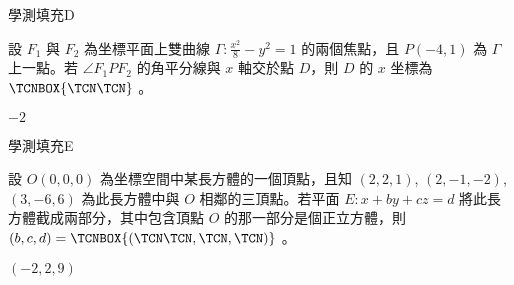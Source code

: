     \begin{QUESTION}
        \begin{ExamInfo}{97}{學測}{填充}{D}
        \end{ExamInfo}
        \begin{ExamAnsRateInfo}{35}{72}{27}{6}
        \end{ExamAnsRateInfo}
        \begin{QBODY}
            設 $F_1$ 與 $F_2$ 為坐標平面上雙曲線 $\Gamma : \frac{x^2}{8} - y^2 =1$ 的兩個焦點，且 $P(-4,1)$ 為 $\Gamma$ 上一點。若 $\angle F_1PF_2$ 的角平分線與 $x$ 軸交於點 $D$，則 $D$ 的 $x$ 坐標為 
$\TCNBOX{\TCN\TCN}$ 。
        \end{QBODY}
        \begin{QFROMS}
        \end{QFROMS}
        \begin{QTAGS}\end{QTAGS}
        \begin{QANS}
            $-2$
        \end{QANS}
        \begin{QSOLLIST}
        \end{QSOLLIST}
        \begin{QEMPTYSPACE}
        \end{QEMPTYSPACE}
    \end{QUESTION}
    \begin{QUESTION}
        \begin{ExamInfo}{97}{學測}{填充}{E}
        \end{ExamInfo}
        \begin{ExamAnsRateInfo}{13}{37}{2}{0}
        \end{ExamAnsRateInfo}
        \begin{QBODY}
            設 $O(0, 0, 0)$ 為坐標空間中某長方體的一個頂點，且知 $(2, 2,1)$, $(2, -1, -2)$, $(3, -6, 6)$ 為此長方體中與 $O$ 相鄰的三頂點。若平面 $E : x + by + cz = d$ 將此長方體截成兩部分，其中包含頂點 $O$ 的那一部分是個正立方體，則 $(b,c,d)= 
\TCNBOX{(\TCN\TCN,\TCN,\TCN)}$ 。
        \end{QBODY}
        \begin{QFROMS}
        \end{QFROMS}
        \begin{QTAGS}\end{QTAGS}
        \begin{QANS}
            $(-2,2,9)$
        \end{QANS}
        \begin{QSOLLIST}
        \end{QSOLLIST}
        \begin{QEMPTYSPACE}
        \end{QEMPTYSPACE}
    \end{QUESTION}

